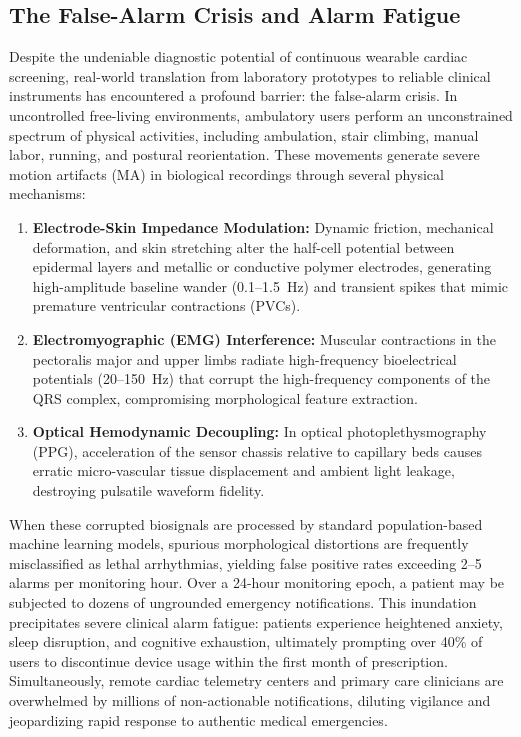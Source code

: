 \documentclass{ieeeaccess}
\begin{document}
\subsection{The False-Alarm Crisis and Alarm Fatigue}
Despite the undeniable diagnostic potential of continuous wearable cardiac screening, real-world translation from laboratory prototypes to reliable clinical instruments has encountered a profound barrier: the false-alarm crisis. In uncontrolled free-living environments, ambulatory users perform an unconstrained spectrum of physical activities, including ambulation, stair climbing, manual labor, running, and postural reorientation. These movements generate severe motion artifacts (MA) in biological recordings through several physical mechanisms:
\begin{enumerate}
\item \textbf{Electrode-Skin Impedance Modulation:} Dynamic friction, mechanical deformation, and skin stretching alter the half-cell potential between epidermal layers and metallic or conductive polymer electrodes, generating high-amplitude baseline wander (0.1--1.5~Hz) and transient spikes that mimic premature ventricular contractions (PVCs).
\item \textbf{Electromyographic (EMG) Interference:} Muscular contractions in the pectoralis major and upper limbs radiate high-frequency bioelectrical potentials (20--150~Hz) that corrupt the high-frequency components of the QRS complex, compromising morphological feature extraction.
\item \textbf{Optical Hemodynamic Decoupling:} In optical photoplethysmography (PPG), acceleration of the sensor chassis relative to capillary beds causes erratic micro-vascular tissue displacement and ambient light leakage, destroying pulsatile waveform fidelity.
\end{enumerate}

When these corrupted biosignals are processed by standard population-based machine learning models, spurious morphological distortions are frequently misclassified as lethal arrhythmias, yielding false positive rates exceeding 2--5 alarms per monitoring hour. Over a 24-hour monitoring epoch, a patient may be subjected to dozens of ungrounded emergency notifications. This inundation precipitates severe clinical alarm fatigue: patients experience heightened anxiety, sleep disruption, and cognitive exhaustion, ultimately prompting over 40\% of users to discontinue device usage within the first month of prescription. Simultaneously, remote cardiac telemetry centers and primary care clinicians are overwhelmed by millions of non-actionable notifications, diluting vigilance and jeopardizing rapid response to authentic medical emergencies.
\end{document}
